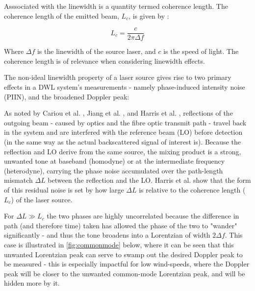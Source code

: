     Asssociated with the linewidth is a quantity termed coherence length. The coherence length of the emitted beam, $L_c$, is given by \cite{bennett_doppler_2003}:
    
    \begin{equation}
        L_c = \frac{c}{2\pi\Delta f}
        \label{eqn:coherenceLength}
    \end{equation}

    Where $\Delta f$ is the linewidth of the source laser, and $c$ is the speed of light. The coherence length is of relevance when considering linewidth effects. 
    
    The non-ideal linewidth property of a laser source gives rise to two primary effects in a DWL system's measurements - namely phase-induced intensity noise (PIIN), and the broadened Doppler peak:

    As noted by Cariou et al. \cite{cariou2006laser}, Jiang et al. \cite{jiang_performance_2019}, and Harris et al. \cite{harris_role_1998}, reflections of the outgoing beam - caused by optics and the fibre optic transmit path - travel back in the system and are interfered with the reference beam (LO) before detection (in the same way as the actual backscattered signal of interest is). Because the reflection and LO derive
    from the same source, the mixing product is a strong, unwanted tone at baseband (homodyne)
    or at the intermediate frequency (heterodyne), carrying the phase noise
    accumulated over the path-length mismatch $\Delta L$ between the reflection and the LO. Harris et
    al. \cite{harris_role_1998} show that the form of this residual noise is set by how large
    $\Delta L$ is relative to the coherence length ($L_c$) of the laser source. 
    
    For $\Delta L \gg L_c$ the two
    phases are highly uncorrelated because the difference in path (and therefore time) taken has allowed the phase of the two to "wander" significantly - and thus the tone broadens into a Lorentzian of width
    $2\Delta f$. This case is illustrated in \autoref{fig:commonmode} below, where it can be seen that this unwanted Lorentzian peak can serve to swamp out the desired Doppler peak to be measured - this is especially impactful for low wind-speeds, where the Doppler peak will be closer to the unwanted common-mode Lorentzian peak, and will be hidden more by it.


